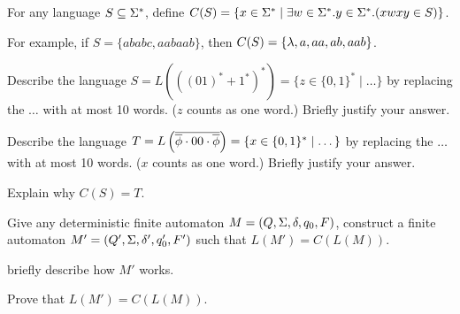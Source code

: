 \documentclass[11pt, sakura, night, 1in]{LatexTemplate/hw}
\begin{document}
For any language $S\subseteq \Sigma^*$, define $C(S)=\{x\in\Sigma^*\mid \exists w\in\Sigma^*. y\in\Sigma^*.(xwxy\in S)\}$.

For example, if $S=\{ababc,aabaab\}$, then $C(S)=\{\lambda,a,aa,ab,aab\}$.

 Describe the language $S=L(((01)^*+1^*)^*)=\{z\in\{0,1\}^*\mid \dots\}$ by replacing the $\dots$ with at most 10 words. ($z$ counts as one word.) Briefly justify your answer.

 Describe the language $T=L\left(\overline{\overline{\phi}\cdot00\cdot\overline{\phi}}\right)=\{x\in\{0,1\}^*\mid \dots\}$ by replacing the $\dots$ with at most 10 words. ($x$ counts as one word.) Briefly justify your answer.

 Explain why $C(S)=T$.

 Give any deterministic finite automaton $M=(Q,\Sigma,\delta,q_0,F)$, construct a finite automaton $M'=(Q',\Sigma,\delta',q_0',F')$ such that $L(M')=C(L(M))$.

 briefly describe how $M'$ works.

 Prove that $L(M')=C(L(M))$.
\end{document}
